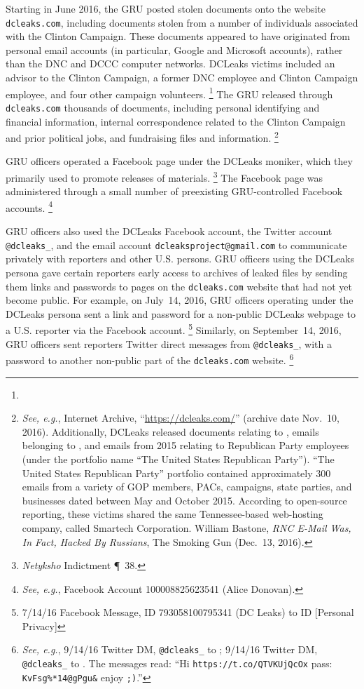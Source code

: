 Starting in June 2016, the GRU posted stolen documents onto the website \verb+dcleaks.com+, including documents stolen from a number of individuals associated with the Clinton Campaign.
These documents appeared to have originated from personal email accounts (in particular, Google and Microsoft accounts), rather than the DNC and DCCC computer networks.
DCLeaks victims included an advisor to the Clinton Campaign, a former DNC employee and Clinton Campaign employee, and four other campaign volunteers.%
\footnote{}
The GRU released through \verb+dcleaks.com+ thousands of documents, including personal identifying and financial information, internal correspondence related to the Clinton Campaign and prior political jobs, and fundraising files and information.%
\footnote{\textit{See, e.g.}, Internet Archive, ``\url{https://dcleaks.com/}'' (archive date Nov.~10, 2016).
Additionally, DCLeaks released documents relating to , emails belonging to , and emails from 2015 relating to Republican Party employees (under the portfolio name ``The United States Republican Party'').
``The United States Republican Party'' portfolio contained approximately 300 emails from a variety of GOP members, PACs, campaigns, state parties, and businesses dated between May and October 2015.
According to open-source reporting, these victims shared the same Tennessee-based web-hosting company, called Smartech Corporation.
William Bastone, \textit{RNC E-Mail Was, In Fact, Hacked By Russians}, The Smoking Gun (Dec.~13, 2016).}

GRU officers operated a Facebook page under the DCLeaks moniker, which they primarily used to promote releases of materials.%
\footnote{\textit{Netyksho} Indictment \P~38.}
The Facebook page was administered through a small number of preexisting GRU-controlled Facebook accounts.%
\footnote{\textit{See, e.g.}, Facebook Account 100008825623541 (Alice Donovan).}

GRU officers also used the DCLeaks Facebook account, the Twitter account \verb+@dcleaks_+, and the email account \verb+dcleaksproject@gmail.com+ to communicate privately with reporters and other U.S. persons.
GRU officers using the DCLeaks persona gave certain reporters early access to archives of leaked files by sending them links and passwords to pages on the \verb+dcleaks.com+ website that had not yet become public.
For example, on July~14, 2016, GRU officers operating under the DCLeaks persona sent a link and password for a non-public DCLeaks webpage to a U.S. reporter via the Facebook account.%
\footnote{7/14/16 Facebook Message, ID 793058100795341 (DC Leaks) to ID [Personal Privacy]}
Similarly, on September~14, 2016, GRU officers sent reporters Twitter direct messages from \verb+@dcleaks_+, with a password to another non-public part of the \verb+dcleaks.com+ website.%
\footnote{\textit{See, e.g.}, 9/14/16 Twitter DM, \verb+@dcleaks_+ to ;
9/14/16 Twitter DM, \verb+@dcleaks_+ to .
The messages read: ``Hi \verb+https://t.co/QTVKUjQcOx+ pass: \verb+KvFsg%*14@gPgu&+ enjoy \verb+;)+.''}

